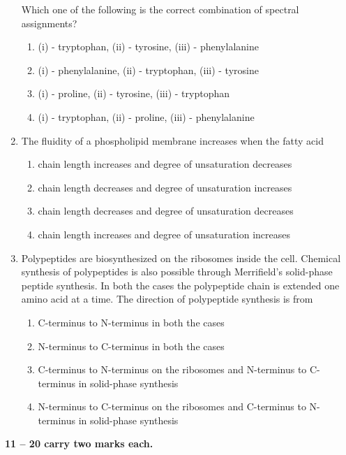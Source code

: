 \documentclass[journal,12pt,onecolumn]{IEEEtran}
\begin{document}
\begin{enumerate}[label=\arabic*.]
Which one of the following is the correct combination of spectral assignments?

\begin{enumerate}[label=(\Alph*)]
\item (i) - tryptophan, (ii) - tyrosine, (iii) - phenylalanine
\item (i) - phenylalanine, (ii) - tryptophan, (iii) - tyrosine
\item (i) - proline, (ii) - tyrosine, (iii) - tryptophan
\item (i) - tryptophan, (ii) - proline, (iii) - phenylalanine
\end{enumerate}

\item The fluidity of a phospholipid membrane increases when the fatty acid

\begin{enumerate}[label=(\Alph*)]
\item chain length increases and degree of unsaturation decreases
\item chain length decreases and degree of unsaturation increases
\item chain length decreases and degree of unsaturation decreases
\item chain length increases and degree of unsaturation increases
\end{enumerate}

\item Polypeptides are biosynthesized on the ribosomes inside the cell. Chemical synthesis of polypeptides is also possible through Merrifield’s solid-phase peptide synthesis. In both the cases the polypeptide chain is extended one amino acid at a time. The direction of polypeptide synthesis is from

\begin{enumerate}[label=(\Alph*)]
\item C-terminus to N-terminus in both the cases
\item N-terminus to C-terminus in both the cases
\item C-terminus to N-terminus on the ribosomes and N-terminus to C-terminus in solid-phase synthesis
\item N-terminus to C-terminus on the ribosomes and C-terminus to N-terminus in solid-phase synthesis
\end{enumerate}

\end{enumerate}

\vspace{0.5cm}
\noindent \textbf{ 11 -- 20 carry two marks each.}
\end{document}
